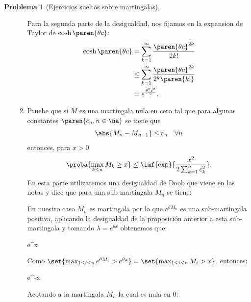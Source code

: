 \documentclass[a5paper,oneside]{amsart}
\theoremstyle{plain}
\theoremstyle{definition}
\newtheorem{problema}{Problema}
\begin{document}
\begin{problema}[Ejercicios sueltos sobre martingalas]
\begin{enumerate}
\begin{enumerate}
                        Para la segunda parte de la desigualdad, nos fijamos en la expansion de Taylor de $\cosh\paren{\theta c}$:
                        \begin{align}
                      \cosh\paren{\theta c}&=\sum_{k=1}^\infty \frac{\paren{\theta c}^{2k}}{2k!} \notag \\
                      &\leq \sum_{k=1}^\infty \frac{\paren{\theta c}^{2k}}{2^k\paren{k!}} \notag \\
                      &=e^{\frac{\theta^2c^2}{2}}.\notag
                        \end{align} 
                        
        \item Pruebe que si \(M\) es una martingala nula en cero tal que para algunas constantes \(\paren{c_n,n\in\na}\) se tiene que
                        $$\abs{M_n-M_{n-1}}\leq c_n\quad\forall n $$
                        entonces, para \(x>0\)
                        $$
                        \proba{\max_{k\leq n} M_k\geq x}\leq \imf{\exp}{\frac{x^2}{2\sum_{k=1}^n c_k^2}}.
                        $$
                        En esta parte utilizaremos una  desigualdad de Doob que viene en las notas y dice que para una sub-martingala $M_n$ se tiene:
                        			\begin{esn} 
                        			\lambda\p{} \leq {}
                        			\end{esn}
                        			En nuestro caso $M_n$ es martingala por lo que $e^{\theta M_n}$ es una sub-martingala positiva, aplicando la desigualdad de la proposici\'on anterior a esta sub-martingala  y tomando $\lambda = e^{\theta x}$ obtenemos que:
                        			\begin{esn}
                        			 e^{\theta x} \leq \esp{ e^{\theta M_n}}
                        			\end{esn}
                        			Como $\set{\max_{1\leq i \leq n} e^{\theta M_i}> e^{\theta x}}=\set{\max_{1\leq i \leq n}  M_i>  x}$, entonces:
                        			\begin{esn}
                        			 \leq  e^{-\theta x} 
                        			\end{esn}
                        			Acotando a la martingala $M_n$ la cual es nula en $0$:
                        			\begin{align}

\end{align}
\end{enumerate}
\end{enumerate}
\end{problema}
\end{document}
